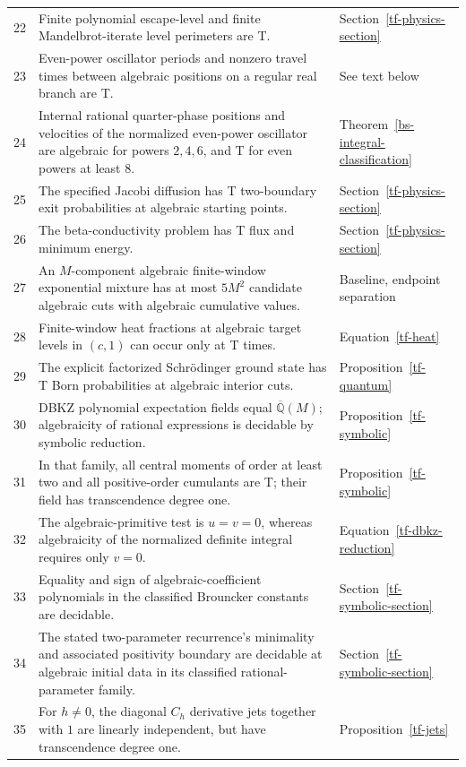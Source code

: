 \documentclass[11pt,a4paper]{article}
\theoremstyle{definition}
\theoremstyle{remark}
\numberwithin{equation}{section}
\newcommand{\Qbar}{\overline{\mathbb Q}}
\begin{document}
\begin{longtable}{@{}L{.055\textwidth}L{.68\textwidth}L{.205\textwidth}@{}}
22 & Finite polynomial escape-level and finite Mandelbrot-iterate level perimeters are T. & Section~\ref{tf-physics-section}\\
23 & Even-power oscillator periods and nonzero travel times between algebraic positions on a regular real branch are T. & See text below\\
24 & Internal rational quarter-phase positions and velocities of the normalized even-power oscillator are algebraic for powers $2,4,6$, and T for even powers at least $8$. & Theorem~\ref{bs-integral-classification}\\
25 & The specified Jacobi diffusion has T two-boundary exit probabilities at algebraic starting points. & Section~\ref{tf-physics-section}\\
26 & The beta-conductivity problem has T flux and minimum energy. & Section~\ref{tf-physics-section}\\
27 & An $M$-component algebraic finite-window exponential mixture has at most $5M^2$ candidate algebraic cuts with algebraic cumulative values. & Baseline, endpoint separation\\
28 & Finite-window heat fractions at algebraic target levels in $(c,1)$ can occur only at T times. & Equation~\eqref{tf-heat}\\
29 & The explicit factorized Schr\"odinger ground state has T Born probabilities at algebraic interior cuts. & Proposition~\ref{tf-quantum}\\
30 & DBKZ polynomial expectation fields equal $\Qbar(M)$; algebraicity of rational expressions is decidable by symbolic reduction. & Proposition~\ref{tf-symbolic}\\
31 & In that family, all central moments of order at least two and all positive-order cumulants are T; their field has transcendence degree one. & Proposition~\ref{tf-symbolic}\\
32 & The algebraic-primitive test is $u=v=0$, whereas algebraicity of the normalized definite integral requires only $v=0$. & Equation~\eqref{tf-dbkz-reduction}\\
33 & Equality and sign of algebraic-coefficient polynomials in the classified Brouncker constants are decidable. & Section~\ref{tf-symbolic-section}\\
34 & The stated two-parameter recurrence's minimality and associated positivity boundary are decidable at algebraic initial data in its classified rational-parameter family. & Section~\ref{tf-symbolic-section}\\
35 & For $h\ne0$, the diagonal $C_h$ derivative jets together with $1$ are linearly independent, but have transcendence degree one. & Proposition~\ref{tf-jets}\\

\end{longtable}
\end{document}
